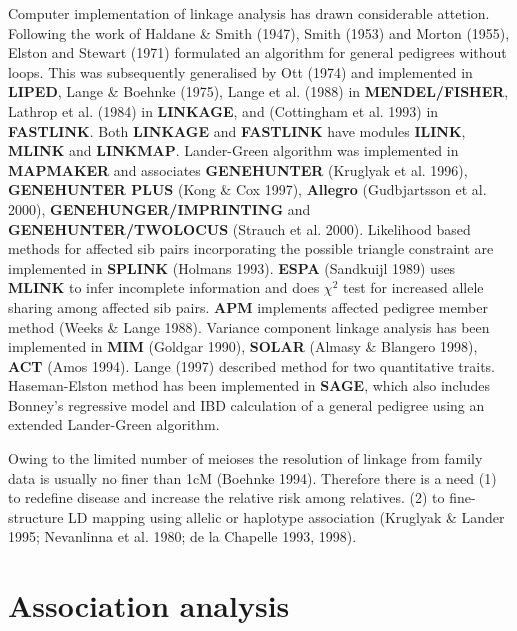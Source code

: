 Computer implementation of linkage analysis has drawn considerable attetion.
Following the work of Haldane \& Smith (1947), Smith (1953) and Morton (1955),
Elston and Stewart (1971) formulated an algorithm for general pedigrees without
loops.  This was subsequently generalised by Ott (1974) and implemented in {\bf
LIPED}, Lange \& Boehnke (1975), Lange et al.  (1988) in {\bf MENDEL/FISHER},
Lathrop et al.  (1984) in {\bf LINKAGE}, and (Cottingham et al.  1993) in {\bf
FASTLINK}.  Both {\bf LINKAGE} and {\bf FASTLINK} have modules {\bf ILINK},
{\bf MLINK} and {\bf LINKMAP}.  Lander-Green algorithm was implemented in {\bf
MAPMAKER} and associates {\bf GENEHUNTER} (Kruglyak et al.  1996), {\bf
GENEHUNTER PLUS} (Kong \& Cox 1997), {\bf Allegro} (Gudbjartsson et al.  2000),
{\bf GENEHUNGER/IMPRINTING} and {\bf GENEHUNTER/TWOLOCUS} (Strauch et al.
2000).  Likelihood based methods for affected sib pairs incorporating the
possible triangle constraint are implemented in {\bf SPLINK} (Holmans 1993).
{\bf ESPA} (Sandkuijl 1989) uses {\bf MLINK} to infer incomplete information
and does $\chi^2$ test for increased allele sharing among affected sib pairs.
{\bf APM} implements affected pedigree member method (Weeks \& Lange 1988).
Variance component linkage analysis has been implemented in {\bf MIM} (Goldgar
1990), {\bf SOLAR} (Almasy \& Blangero 1998), {\bf ACT} (Amos 1994).  Lange
(1997) described method for two quantitative traits.  Haseman-Elston method has
been implemented in {\bf SAGE}, which also includes Bonney's regressive model
and IBD calculation of a general pedigree using an extended Lander-Green
algorithm.

Owing to the limited number of meioses the resolution of linkage from family
data is usually no finer than 1cM (Boehnke 1994).  Therefore there is a need
(1) to redefine disease and increase the relative risk among relatives.  (2) to
fine-structure LD mapping using allelic or haplotype association (Kruglyak \&
Lander 1995; Nevanlinna et al.  1980; de la Chapelle 1993, 1998).


\section{Association analysis}

